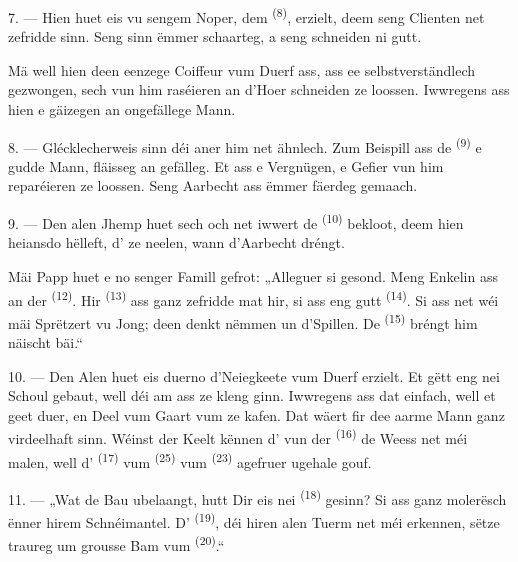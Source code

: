 7. --- Hien huet eis vu sengem Noper, dem  \textsuperscript{(8)},
erzielt, deem seng Clienten net zefridde sinn. Seng  sinn ëmmer
schaarteg, a seng  schneiden ni gutt.

Mä well hien deen eenzege Coiffeur vum Duerf ass, ass ee selbstverständlech
gezwongen, sech vun him raséieren an d'Hoer schneiden ze loossen. Iwwregens ass hien e
gäizegen an ongefällege Mann.

8. --- Glécklecherweis sinn déi aner  him net ähnlech. Zum Beispill
ass de  \textsuperscript{(9)} e gudde Mann, fläisseg an
gefälleg. Et ass e Vergnügen, e Gefier vun him reparéieren ze loossen. Seng
Aarbecht ass ëmmer fäerdeg gemaach.

9. --- Den alen Jhemp huet sech och net iwwert de 
\textsuperscript{(10)} bekloot, deem hien heiansdo hëlleft, d' ze
neelen, wann d'Aarbecht dréngt.

Mäi Papp huet e no senger Famill gefrot: „Alleguer si gesond. Meng Enkelin ass an der
 \textsuperscript{(12)}. Hir  \textsuperscript{(13)}
ass ganz zefridde mat hir, si ass eng gutt  \textsuperscript{(14)}.
Si ass net wéi mäi Sprëtzert vu Jong; deen denkt nëmmen un d'Spillen. De
 \textsuperscript{(15)} bréngt him näischt bäi.“

\VUsaut{3.0mm}
\VUsaut{3.0mm}

10. --- Den Alen huet eis duerno d'Neiegkeete vum Duerf erzielt. Et gëtt eng nei
Schoul gebaut, well déi am  ass ze kleng ginn. Iwwregens ass dat
einfach, well et geet duer, en Deel vum Gaart vum  ze kafen.
Dat wäert fir dee aarme Mann ganz virdeelhaft sinn. Wéinst der Keelt kënnen
d' vun der  \textsuperscript{(16)} de Weess net méi
malen, well d' \textsuperscript{(17)} vum 
\textsuperscript{(25)} vum  \textsuperscript{(23)} agefruer
ugehale gouf.

11. --- „Wat de Bau ubelaangt, hutt Dir eis nei 
\textsuperscript{(18)} gesinn? Si ass ganz molerësch ënner hirem Schnéimantel.
D' \textsuperscript{(19)}, déi hiren alen Tuerm net méi erkennen,
sëtze traureg um grousse Bam vum  \textsuperscript{(20)}.“

